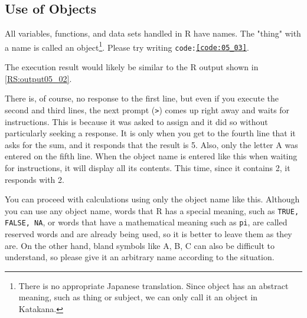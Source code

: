 \documentclass{ltjsbook}
\begin{document}
\subsection{Use of Objects}
All variables, functions, and data sets handled in R have names. The "thing" with a name is called an object\footnote{There is no appropriate Japanese translation. Since object has an abstract meaning, such as thing or subject, we can only call it an object in Katakana.}. Please try writing \texttt{code:\ref{code:05_03}}.



The execution result would likely be similar to the R output shown in \ref{RS:output05_02}.

There is, of course, no response to the first line, but even if you execute the second and third lines, the next prompt (\verb|>|) comes up right away and waits for instructions. This is because it was asked to assign and it did so without particularly seeking a response. It is only when you get to the fourth line that it asks for the sum, and it responds that the result is 5. Also, only the letter A was entered on the fifth line. When the object name is entered like this when waiting for instructions, it will display all its contents. This time, since it contains 2, it responds with 2.

You can proceed with calculations using only the object name like this. Although you can use any object name, words that R has a special meaning, such as \texttt{TRUE, FALSE, NA}, or words that have a mathematical meaning such as \texttt{pi}, are called reserved words and are already being used, so it is better to leave them as they are. On the other hand, bland symbols like A, B, C can also be difficult to understand, so please give it an arbitrary name according to the situation.
\end{document}
